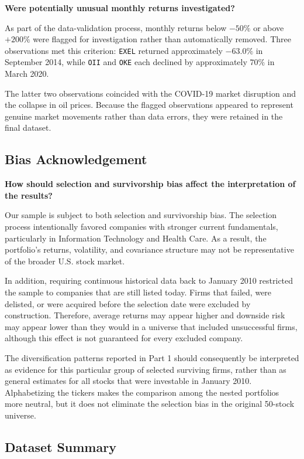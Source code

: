 \documentclass[11pt]{article}
\begin{document}
\textbf{Were potentially unusual monthly returns investigated?}

As part of the data-validation process, monthly returns below $-50\%$ or above
$+200\%$ were flagged for investigation rather than automatically removed.
Three observations met this criterion: \texttt{EXEL} returned approximately
$-63.0\%$ in September 2014, while \texttt{OII} and \texttt{OKE} each declined
by approximately $70\%$ in March 2020.

The latter two observations coincided with the COVID-19 market disruption and
the collapse in oil prices. Because the flagged observations appeared to
represent genuine market movements rather than data errors, they were retained
in the final dataset.

\subsection{Bias Acknowledgement}

\textbf{How should selection and survivorship bias affect the interpretation
of the results?}

Our sample is subject to both selection and survivorship bias. The selection
process intentionally favored companies with stronger current fundamentals,
particularly in Information Technology and Health Care. As a result, the
portfolio's returns, volatility, and covariance structure may not be
representative of the broader U.S. stock market.

In addition, requiring continuous historical data back to January 2010
restricted the sample to companies that are still listed today. Firms that
failed, were delisted, or were acquired before the selection date were excluded
by construction. Therefore, average returns may appear higher and downside risk
may appear lower than they would in a universe that included unsuccessful
firms, although this effect is not guaranteed for every excluded company.

The diversification patterns reported in Part 1 should consequently be
interpreted as evidence for this particular group of selected surviving firms,
rather than as general estimates for all stocks that were investable in January
2010. Alphabetizing the tickers makes the comparison among the nested
portfolios more neutral, but it does not eliminate the selection bias in the
original 50-stock universe.

\subsection{Dataset Summary}
\end{document}
